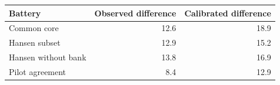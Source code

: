 \begin{tabular}{lrr}
\toprule
Battery & Observed difference & Calibrated difference \\
\midrule
Common core & 12.6 & 18.9 \\
Hansen subset & 12.9 & 15.2 \\
Hansen without bank & 13.8 & 16.9 \\
Pilot agreement & 8.4 & 12.9 \\
\bottomrule
\end{tabular}
